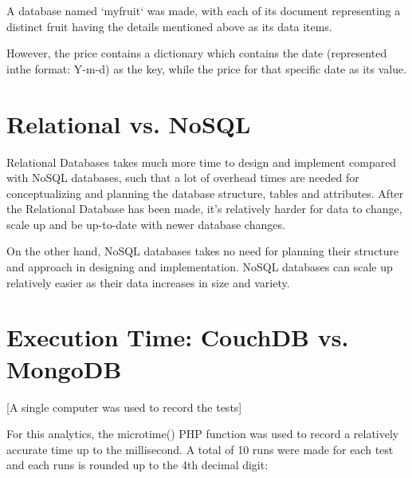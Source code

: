 \documentclass[journal]{./IEEE/IEEEtran}
\begin{document}
A database named `myfruit` was made, with each of its document representing a distinct fruit having the details mentioned above as its data items.

However, the price contains a dictionary which contains the date (represented inthe format: Y-m-d) as the key, while the price for that specific date as its value.

\section{Relational vs. NoSQL}

Relational Databases takes much more time to design and implement compared with NoSQL databases, such that a lot of overhead times are needed for conceptualizing and planning the database structure, tables and attributes. After the Relational Database has been made, it's relatively harder for data to change, scale up and be up-to-date with newer database changes.

On the other hand, NoSQL databases takes no need for planning their structure and approach in designing and implementation. NoSQL databases can scale up relatively easier as their data increases in size and variety.

\section{Execution Time: CouchDB vs. MongoDB}

[A single computer was used to record the tests]

For this analytics, the microtime() PHP function was used to record a relatively accurate time up to the millisecond. A total of 10 runs were made for each test and each runs is rounded up to the 4th decimal digit:
\end{document}
